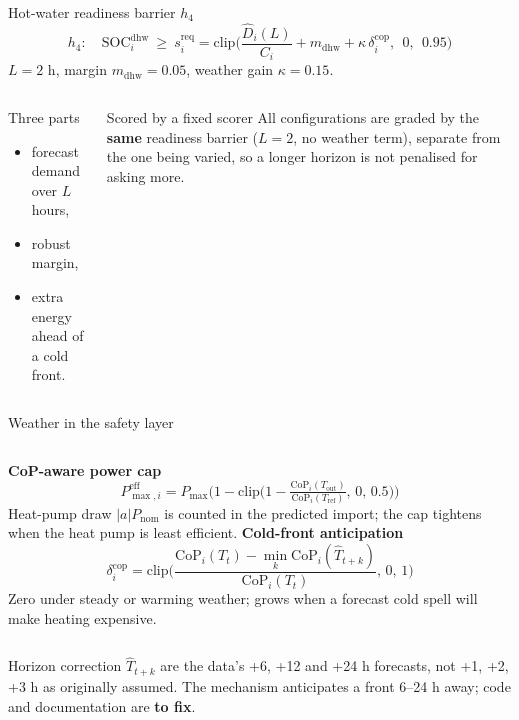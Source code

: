 \documentclass[aspectratio=169,10pt]{beamer}
\newcommand{\SOC}{\mathrm{SOC}}
\newcommand{\tagtodo}{\textcolor{stemsred}{\textbf{to fix}}}
\begin{document}
\begin{frame}{Hot-water readiness barrier $h_4$}
\[
h_4:\quad \SOC^{\text{dhw}}_i \ \ge\ s^{\text{req}}_i = \mathrm{clip}\Big(\frac{\hat D_i(L)}{C_i} + m_{\text{dhw}} + \kappa\,\delta^{\text{cop}}_i,\ \ 0,\ \ 0.95\Big)
\]
\small $L = 2$ h, margin $m_{\text{dhw}} = 0.05$, weather gain $\kappa = 0.15$.
\vspace{0.4em}
\begin{columns}[T]
\begin{block}{Three parts}
\begin{itemize}
  \item forecast demand over $L$ hours,
  \item robust margin,
  \item extra energy ahead of a cold front.
\end{itemize}
\end{block}
\begin{block}{Scored by a fixed scorer}
All configurations are graded by the \textbf{same} readiness barrier ($L = 2$, no weather term), separate from the one being varied, so a longer horizon is not penalised for asking more.
\end{block}
\end{columns}
\end{frame}

\begin{frame}{Weather in the safety layer}
\begin{columns}[T]
\textbf{CoP-aware power cap}
\[
P^{\text{eff}}_{\max,i} = P_{\max}\Big(1 - \mathrm{clip}\big(1 - \tfrac{\mathrm{CoP}_i(T_{\text{out}})}{\mathrm{CoP}_i(T_{\text{ref}})},\,0,\,0.5\big)\Big)
\]
Heat-pump draw $|a|P_{\text{nom}}$ is counted in the predicted import; the cap tightens when the heat pump is least efficient.
\textbf{Cold-front anticipation}
\[
\delta^{\text{cop}}_i = \mathrm{clip}\Big(\frac{\mathrm{CoP}_i(T_t) - \min_{k}\mathrm{CoP}_i(\hat T_{t+k})}{\mathrm{CoP}_i(T_t)},\,0,\,1\Big)
\]
Zero under steady or warming weather; grows when a forecast cold spell will make heating expensive.
\end{columns}
\vspace{0.5em}
\begin{alertblock}{Horizon correction}
$\hat T_{t+k}$ are the data's +6, +12 and +24 h forecasts, not +1, +2, +3 h as originally assumed. The mechanism anticipates a front 6--24 h away; code and documentation are \tagtodo.
\end{alertblock}
\end{frame}
\end{document}
